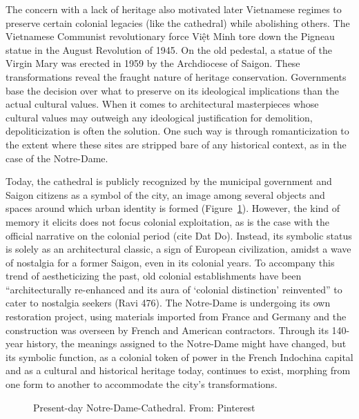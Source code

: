The concern with a lack of heritage also motivated later Vietnamese regimes to preserve certain colonial legacies (like the cathedral) while abolishing others. The Vietnamese Communist revolutionary force Việt Minh tore down the Pigneau statue in the August Revolution of 1945. On the old pedestal, a statue of the Virgin Mary was erected in 1959 by the Archdiocese of Saigon.  These transformations reveal the fraught nature of heritage conservation. Governments base the decision over what to preserve on its ideological implications than the actual cultural values. When it comes to architectural masterpieces whose cultural values may outweigh any ideological justification for demolition, depoliticization is often the solution. One such way is through romanticization to the extent where these sites are stripped bare of any historical context, as in the case of the Notre-Dame.

Today, the cathedral is publicly recognized by the municipal government and Saigon citizens as a symbol of the city, an image among several objects and spaces around which urban identity is formed (Figure~\ref{cathedral_present}). However, the kind of memory it elicits does not focus colonial exploitation, as is the case with the official narrative on the colonial period (cite Dat Do). Instead, its symbolic status is solely as an architectural classic, a sign of European civilization, amidst a wave of nostalgia for a former Saigon, even in its colonial years. To accompany this trend of aestheticizing the past, old colonial establishments have been “architecturally re-enhanced and its aura of ‘colonial distinction’ reinvented” to cater to nostalgia seekers (Ravi 476).  The Notre-Dame is undergoing its own restoration project, using materials imported from France and Germany and the construction was overseen by French and American contractors. Through its 140-year history, the meanings assigned to the Notre-Dame might have changed, but its symbolic function, as a colonial token of power in the French Indochina capital and as a cultural and historical heritage today, continues to exist, morphing from one form to another to accommodate the city’s transformations. \en

\begin{figure}[!ht]
\begin{center}
\vspace{-.2 in}
\caption[Present-day Notre-Dame Cathedral]{Present-day Notre-Dame-Cathedral. From: Pinterest \en}\label{cathedral_present}
\end{center}
\vspace{-.2 in}
\end{figure}

